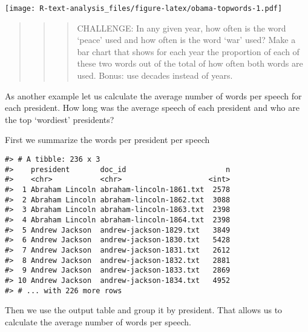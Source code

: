 \documentclass[]{book}
\newenvironment{Shaded}{\begin{snugshade}}{\end{snugshade}}
\newcommand{\DataTypeTok}[1]{\textcolor[rgb]{0.13,0.29,0.53}{#1}}
\newcommand{\KeywordTok}[1]{\textcolor[rgb]{0.13,0.29,0.53}{\textbf{#1}}}
\newcommand{\NormalTok}[1]{#1}
\newcommand{\OperatorTok}[1]{\textcolor[rgb]{0.81,0.36,0.00}{\textbf{#1}}}
\newcommand{\StringTok}[1]{\textcolor[rgb]{0.31,0.60,0.02}{#1}}
\begin{document}
\texttt{[image: R-text-analysis\_files/figure-latex/obama-topwords-1.pdf]}

\begin{quote}
\begin{quote}
\begin{quote}
CHALLENGE: In any given year, how often is the word `peace' used and how often is the word `war' used? Make a bar chart that shows for each year the proportion of each of these two words out of the total of how often both words are used. Bonus: use decades instead of years.
\end{quote}
\end{quote}
\end{quote}

As another example let us calculate the average number of words per speech for each president. How long was the average speech of each president and who are the top `wordiest' presidents?

First we summarize the words per president per speech

\begin{Shaded}
\end{Shaded}

\begin{verbatim}
#> # A tibble: 236 x 3
#>    president       doc_id                       n
#>    <chr>           <chr>                    <int>
#>  1 Abraham Lincoln abraham-lincoln-1861.txt  2578
#>  2 Abraham Lincoln abraham-lincoln-1862.txt  3088
#>  3 Abraham Lincoln abraham-lincoln-1863.txt  2398
#>  4 Abraham Lincoln abraham-lincoln-1864.txt  2398
#>  5 Andrew Jackson  andrew-jackson-1829.txt   3849
#>  6 Andrew Jackson  andrew-jackson-1830.txt   5428
#>  7 Andrew Jackson  andrew-jackson-1831.txt   2612
#>  8 Andrew Jackson  andrew-jackson-1832.txt   2881
#>  9 Andrew Jackson  andrew-jackson-1833.txt   2869
#> 10 Andrew Jackson  andrew-jackson-1834.txt   4952
#> # ... with 226 more rows
\end{verbatim}

Then we use the output table and group it by president. That allows us to calculate the average number of words per speech.

\begin{Shaded}
\end{Shaded}
\end{document}
